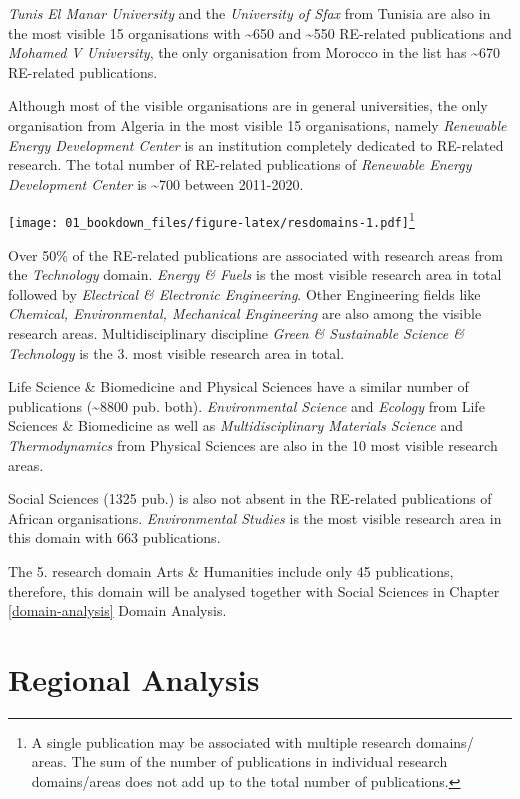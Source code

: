 \documentclass[
]{book}
\begin{document}
\emph{Tunis El Manar University} and the \emph{University of Sfax} from Tunisia are also in the most visible 15 organisations with \textasciitilde650 and \textasciitilde550 RE-related publications and \emph{Mohamed V University}, the only organisation from Morocco in the list has \textasciitilde670 RE-related publications.

Although most of the visible organisations are in general universities, the only organisation from Algeria in the most visible 15 organisations, namely \emph{Renewable Energy Development Center} is an institution completely dedicated to RE-related research. The total number of RE-related publications of \emph{Renewable Energy Development Center} is \textasciitilde700 between 2011-2020.

\texttt{[image: 01\_bookdown\_files/figure-latex/resdomains-1.pdf]}\footnote{A single publication may be associated with multiple research domains/ areas. The sum of the number of publications in individual research domains/areas does not add up to the total number of publications.}

Over 50\% of the RE-related publications are associated with research areas from the \emph{Technology} domain. \emph{Energy \& Fuels} is the most visible research area in total followed by \emph{Electrical \& Electronic Engineering}. Other Engineering fields like \emph{Chemical, Environmental, Mechanical Engineering} are also among the visible research areas. Multidisciplinary discipline \emph{Green \& Sustainable Science \& Technology} is the 3. most visible research area in total.

Life Science \& Biomedicine and Physical Sciences have a similar number of publications (\textasciitilde8800 pub. both). \emph{Environmental Science} and \emph{Ecology} from Life Sciences \& Biomedicine as well as \emph{Multidisciplinary Materials Science} and \emph{Thermodynamics} from Physical Sciences are also in the 10 most visible research areas.

Social Sciences (1325 pub.) is also not absent in the RE-related publications of African organisations. \emph{Environmental Studies} is the most visible research area in this domain with 663 publications.

The 5. research domain Arts \& Humanities include only 45 publications, therefore, this domain will be analysed together with Social Sciences in Chapter \ref{domain-analysis} Domain Analysis.

\hypertarget{regional-analysis}{%
\section{Regional Analysis}\label{regional-analysis}}
\end{document}
